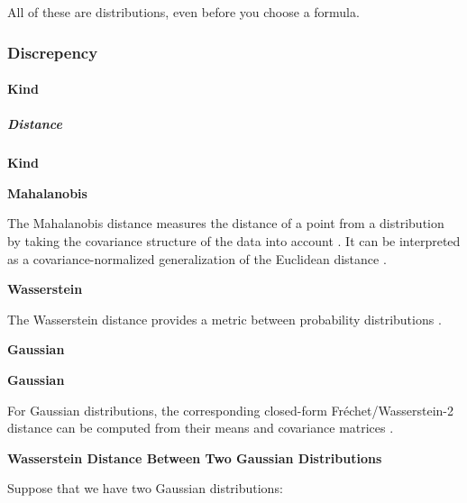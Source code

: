 \documentclass{book}
\providecommand{\ProjectDeepHeading}[2]{%
    \par\medskip\noindent\textbf{#2}\par\smallskip
}
\begin{document}
All of these are distributions, even before you choose a formula.

\subsubsection{Discrepency}

\paragraph{Kind}

\subparagraph{Distance}

\ProjectDeepHeading{1}{Kind}

\ProjectDeepHeading{2}{Mahalanobis}


The Mahalanobis distance measures the distance of a point from a distribution by
    taking the covariance structure of the data into account \citep{mahalanobis-1936-on-the-generalised-distance-in-statistics}.
    It can be interpreted as a covariance-normalized generalization of the Euclidean
    distance \citep{de-maesschalck-2000-the-mahalanobis-distance}.

\ProjectDeepHeading{2}{Wasserstein}


The Wasserstein distance provides a metric between probability distributions
    \citep{vaserstein-1969-markov-processes-over-denumerable-products-of-spaces-describing-large-systems-of-automata}.
    
    
    \ProjectDeepHeading{5}{Gaussian}

\ProjectDeepHeading{3}{Gaussian}


For Gaussian distributions, the corresponding closed-form Fr{\'e}chet/Wasserstein-2
    distance can be computed from their means and covariance matrices
    \cite{dowson-1982-the-frechet-distance-between-multivariate-normal-distributions}.
    
    
    \ProjectDeepHeading{6}{Wasserstein Distance Between Two Gaussian Distributions}
        
        Suppose that we have two Gaussian distributions:
        
\end{document}
